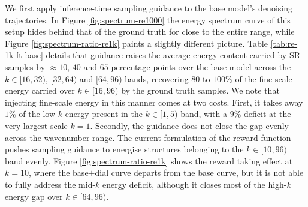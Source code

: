 
We first apply inference-time sampling guidance to the base model's denoising
trajectories. In Figure \ref{fig:spectrum-re1000} the energy spectrum curve of this
setup hides behind that of the ground truth for close to the entire range, while Figure
\ref{fig:spectrum-ratio-re1k} paints a slightly different picture. Table
\ref{tab:re-1k-ft-base} details that guidance raises the average energy content carried
by SR samples by $\approx10$, $40$ and $65$ percentage points over the base model across
the $k\in[16,32)$, $[32,64)$ and $[64,96)$ bands, recovering $80$ to $100\%$ of the
fine-scale energy carried over $k\in[16,96)$ by the ground truth samples. We note that
injecting fine-scale energy in this manner comes at two costs. First, it takes away
$1\%$ of the low-$k$ energy present in the $k\in[1,5)$ band, with a $9\%$ deficit at the
very largest scale $k=1$. Secondly, the guidance does not close the gap evenly across
the wavenumber range. The current formulation of the reward function pushes sampling
guidance to energise structures belonging to the $k\in[10,96)$ band evenly. Figure
\ref{fig:spectrum-ratio-re1k} shows the reward taking effect at $k=10$, where the
base$+$dial curve departs from the base curve, but it is not able to fully address the
mid-$k$ energy deficit, although it closes most of the high-$k$ energy gap over
$k\in[64,96)$.\newline

